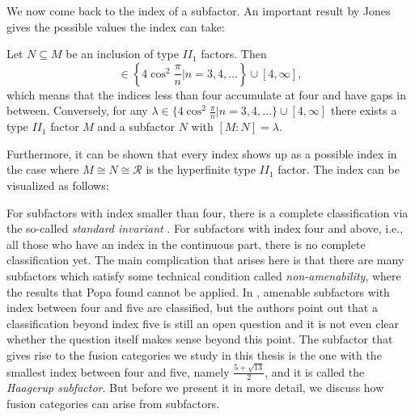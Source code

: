 We now come back to the index of a subfactor. An important result by Jones \cite{Jones1983} gives the possible values the index can take:
	\begin{thm}
		Let $N\subseteq M$ be an inclusion of type $II_1$ factors. Then	
		\begin{equation}
			[M:N]\in\left\{4\cos^2\frac{\pi}{n}|n=3,4,\dots\right\}\cup[4,\infty],
		\end{equation}
		which means that the indices less than four accumulate at four and have gaps in between. Conversely, for any $\lambda\in\{4\cos^2\frac{\pi}{n}|n=3,4,\dots\}\cup[4,\infty]$ there exists a type $II_1$ factor $M$ and a subfactor $N$ with $[M:N]=\lambda$.
	\end{thm}
Furthermore, it can be shown that every index shows up as a possible index in the case where $M\cong N\cong\mathcal{R}$ is the hyperfinite type $II_1$ factor. The index can be visualized as follows:
	\begin{figure}[H]
		\centering
	\end{figure}

For subfactors with index smaller than four, there is a complete classification via the so-called \emph{standard invariant} \cite{Popa1990,Popa1994}. For subfactors with index four and above, i.e., all those who have an index in the continuous part, there is no complete classification yet. The main complication that arises here is that there are many subfactors which satisfy some technical condition called \emph{non-amenability}, where the results that Popa found cannot be applied. In \cite{Jones2013}, amenable subfactors with index between four and five are classified, but the authors point out that a classification beyond index five is still an open question and it is not even clear whether the question itself makes sense beyond this point. The subfactor that gives rise to the fusion categories we study in this thesis is the one with the smallest index between four and five, namely $\frac{5+\sqrt{13}}{2}$, and it is called the \emph{Haagerup subfactor}. But before we present it in more detail, we discuss how fusion categories can arise from subfactors.


